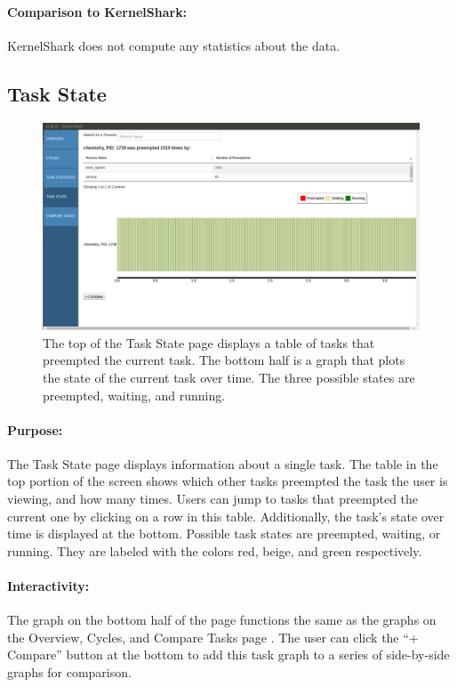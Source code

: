\documentclass{hmcclinic}
\begin{document}
\paragraph{Comparison to KernelShark:} KernelShark does not compute any
statistics about the data.


  \subsection{Task State}

  \begin{figure}[H]
  \includegraphics[scale=0.3]{task-state-page.png}
  \caption{The top of the Task State page displays a table of tasks
  that preempted the current task. The bottom half is a graph that plots the
state of the current task over time. The three possible states are preempted,
waiting, and running.}
\end{figure}

\paragraph{Purpose:}
    The Task State page displays information about a single task. The table in the top portion of the screen shows which other tasks preempted the task the user is viewing, and how many times. Users can jump to tasks that preempted the current one by
    clicking on a row in this table. Additionally, the task's state over time
    is displayed at the bottom. Possible task states are preempted, waiting, or
    running. They are labeled with the colors red, beige, and green respectively. 

\paragraph{Interactivity:}
    The graph on the bottom half of the page functions the same as the graphs on
    the Overview, Cycles, and Compare Tasks page
    . The user can click the ``+ Compare'' button at the bottom
    to add this task graph to a series of side-by-side graphs for comparison.
    
\end{document}
